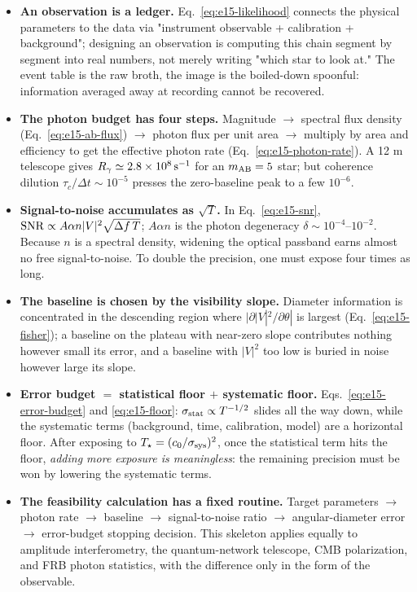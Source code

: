\begin{itemize}
  \item \textbf{An observation is a ledger.} Eq.~\eqref{eq:e15-likelihood} connects the physical parameters to the data via "instrument observable + calibration + background"; designing an observation is computing this chain segment by segment into real numbers, not merely writing "which star to look at." The event table is the raw broth, the image is the boiled-down spoonful: information averaged away at recording cannot be recovered.
  \item \textbf{The photon budget has four steps.} Magnitude $\to$ spectral flux density (Eq.~\eqref{eq:e15-ab-flux}) $\to$ photon flux per unit area $\to$ multiply by area and efficiency to get the effective photon rate (Eq.~\eqref{eq:e15-photon-rate}). A 12 m telescope gives $R_\gamma\simeq2.8\times10^8\,{\rm s^{-1}}$ for an $m_{\rm AB}=5$ star; but coherence dilution $\tau_c/\Delta t\sim10^{-5}$ presses the zero-baseline peak to a few $10^{-6}$.
  \item \textbf{Signal-to-noise accumulates as $\sqrt T$.} In Eq.~\eqref{eq:e15-snr}, ${\rm SNR}\propto A\alpha n|V|^2\sqrt{\Delta f\,T}$; $A\alpha n$ is the photon degeneracy $\delta\sim10^{-4}$--$10^{-2}$. Because $n$ is a spectral density, widening the optical passband earns almost no free signal-to-noise. To double the precision, one must expose four times as long.
  \item \textbf{The baseline is chosen by the visibility slope.} Diameter information is concentrated in the descending region where $|\partial|V|^2/\partial\theta|$ is largest (Eq.~\eqref{eq:e15-fisher}); a baseline on the plateau with near-zero slope contributes nothing however small its error, and a baseline with $|V|^2$ too low is buried in noise however large its slope.
  \item \textbf{Error budget $=$ statistical floor $+$ systematic floor.} Eqs.~\eqref{eq:e15-error-budget} and \eqref{eq:e15-floor}: $\sigma_{\rm stat}\propto T^{-1/2}$ slides all the way down, while the systematic terms (background, time, calibration, model) are a horizontal floor. After exposing to $T_\star=(c_0/\sigma_{\rm sys})^2$, once the statistical term hits the floor, \emph{adding more exposure is meaningless}: the remaining precision must be won by lowering the systematic terms.
  \item \textbf{The feasibility calculation has a fixed routine.} Target parameters $\to$ photon rate $\to$ baseline $\to$ signal-to-noise ratio $\to$ angular-diameter error $\to$ error-budget stopping decision. This skeleton applies equally to amplitude interferometry, the quantum-network telescope, CMB polarization, and FRB photon statistics, with the difference only in the form of the observable.
\end{itemize}

